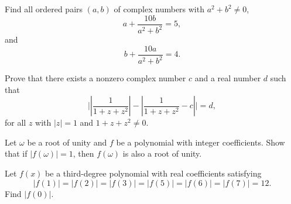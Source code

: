 \begin{question}[name={2014 HMMT, Guts, \href{https://artofproblemsolving.com/community/c129h603993p3586761}{Problem 32}}]
	Find all ordered pairs $(a,b)$ of complex numbers with $a^2+b^2\neq 0$, $$a+\frac{10b}{a^2+b^2}=5,$$ and $$b+\frac{10a}{a^2+b^2}=4.$$
\end{question}




%	







\begin{question}[name={2014 HMMT, Team, \href{https://artofproblemsolving.com/community/c129h578709p3414337}{Problem 5}}]
	Prove that there exists a nonzero complex number $c$ and a real number $d$ such that\[\Bigg|\left|\dfrac1{1+z+z^2}\right|-\left|\dfrac1{1+z+z^2}-c\right|\Bigg|=d,\]for all $z$ with $|z|=1$ and $1+z+z^2\neq 0$.
\end{question}




%	







\begin{question}[name={2014 HMIC, \href{https://artofproblemsolving.com/community/c129h1359782p7448398}{Problem 4}}]
	Let $\omega$ be a root of unity and $f$ be a polynomial with integer coefficients. Show that if $|f(\omega)|=1$, then $f(\omega)$ is also a root of unity.
\end{question}




%	




\begin{question}[name={2015 AIME I, \href{https://artofproblemsolving.com/community/c4p4622257}{Problem 10}}]
	Let $f(x)$ be a third-degree polynomial with real coefficients satisfying
	\[|f(1)|=|f(2)|=|f(3)|=|f(5)|=|f(6)|=|f(7)|=12.\]Find $|f(0)|$.
\end{question}


